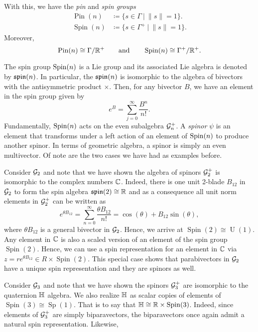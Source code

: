 With this, we have the \emph{pin} and \emph{spin groups}
\begin{align*}
    \operatorname{Pin}(n) &\coloneqq \{s\in \Gamma ~\vert~ \|s\|=1\}.\\
    \operatorname{Spin}(n) &\coloneqq \{s\in \Gamma^+ ~\vert~ \|s\|=1\}.
\end{align*}
Moreover,
\[
\operatorname{Pin}(n) \cong \Gamma/\mathbb{R}^+ \qquad \textrm{and} \qquad \operatorname{Spin}(n) \cong \Gamma^+/\mathbb{R}^+.
\]

The spin group $\operatorname{Spin}(n)$ is a Lie group and its associated Lie algebra is denoted by $\mathfrak{spin}(n)$. In particular, the $\mathfrak{spin}(n)$ is isomorphic to the algebra of bivectors with the antisymmetric product $\times$.  Then, for any bivector $B$, we have an element in the spin group given by
\[
e^{B} = \sum_{j=0}^\infty \frac{B^n}{n!}.
\]
Fundamentally, $\operatorname{Spin}(n)$ acts on the even subalgebra $\mathcal{G}_n^+$. A \emph{spinor} $\psi$ is an element that transforms under a left action of an element of $\operatorname{Spin}(n)$ to produce another spinor.  In terms of geometric algebra, a spinor is simply an even multivector.  Of note are the two cases we have had as examples before. 

\begin{example}
    Consider $\mathcal{G}_2$ and note that we have shown the algebra of spinors $\mathcal{G}_2^+$ is isomorphic to the complex numbers $\mathbb{C}$.  Indeed, there is one unit 2-blade $B_{12}$ in $\mathcal{G}_2$ to form the spin algebra $\mathfrak{spin}(2) \cong \mathbb{R}$ and as a consequence all unit norm elements in $\mathcal{G}_2^+$ can be written as
    \[
       e^{\theta B_{12}} = \sum_{n=0}^\infty \frac{\theta B_{12}}{n!} = \cos(\theta)+B_{12}\sin(\theta),
    \]
    where $\theta B_{12}$ is a general bivector in $\mathcal{G}_2$.  Hence, we arrive at $\operatorname{Spin}(2)\cong \operatorname{U}(1)$. Any element in $\mathbb{C}$ is also a scaled version of an element of the spin group $\operatorname{Spin}(2)$. Hence, we can use a spin representation for an element in $\mathbb{C}$ via $z=re^{\theta B_{12}} \in R\times \operatorname{Spin}(2)$.  This special case shows that parabivectors in $\mathcal{G}_2$ have a unique spin representation and they are spinors as well.
\end{example}

\begin{example}
    Consider $\mathcal{G}_3$ and note that we have shown the spinors $\mathcal{G}_3^+$ are isomorphic to the quaternion $\mathbb{H}$ algebra.  We also realize $\mathbb{H}$ as scalar copies of elements of $\operatorname{Spin}(3) \cong \operatorname{Sp}(1)$.  That is to say that $\mathbb{H} \cong \mathbb{R} \times \operatorname{Spin}(3)$. Indeed, since elements of $\mathcal{G}_3^+$ are simply biparavectors, the biparavectors once again admit a natural spin representation. Likewise, 
\end{example}

